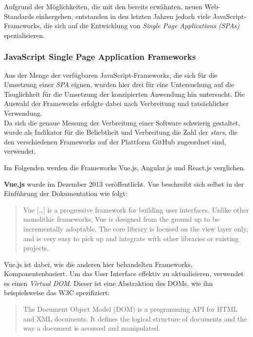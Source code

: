 Aufgrund der Möglichkeiten, die mit den bereits erwähnten, neuen Web-Standards einhergehen, entstanden in den letzten Jahren jedoch viele JavaScript-Frameworks, die sich auf die Entwicklung von \textit{Single Page Applications (SPAs)} spezialisieren.


\subsubsection{JavaScript Single Page Application Frameworks}

Aus der Menge der verfügbaren JavaScript-Frameworks, die sich für die Umsetzung einer \textit{SPA} eignen, wurden hier drei für eine Untersuchung auf die Tauglichkeit für die Umsetzung der konzipierten Anwendung hin untersucht.
Die Auswahl der Frameworks erfolgte dabei nach Verbreitung und tatsächlicher Verwendung.\\
Da sich die genaue Messung der Verbreitung einer Software schwierig gestaltet, wurde als Indikator für die Beliebtheit und Verbreitung die Zahl der \textit{stars}\footnotemark{}, die den verschiedenen Frameworks auf der Plattform GitHub  zugeordnet sind, verwendet.


Im Folgenden werden die Frameworks Vue.js, Angular.js und React.js verglichen.

\textbf{Vue.js} \cite{vue} wurde im Dezember 2013 veröffentlicht.
Vue beschreibt sich selbst in der Einführung der Dokumentation wie folgt:

\begin{quote}
  Vue […] is a progressive framework for building user interfaces. Unlike other monolithic frameworks, Vue is designed from the ground up to be incrementally adoptable. The core library is focused on the view layer only, and is very easy to pick up and integrate with other libraries or existing projects. \cite{VueIntro}
\end{quote}

Vue.js ist dabei, wie die anderen hier behandelten Frameworks, Komponentenbasiert. Um das User Interface effektiv zu aktualisieren, verwendet es einen \textit{Virtual DOM}. Dieser ist eine Abstraktion des DOMs, wie ihn beispielsweise das W3C spezifiziert:

\begin{quote}
  The Document Object Model (DOM) is a programming API for HTML and XML documents. It defines the logical structure of documents and the way a document is accessed and manipulated.  \cite{w3cDOM}
\end{quote}

